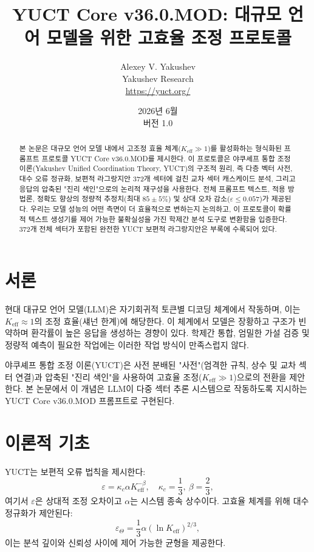 \documentclass[11pt,a4paper]{article}
\title{\textbf{YUCT Core v36.0.MOD: 대규모 언어 모델을 위한 고효율 조정 프로토콜}}
\author{Alexey V. Yakushev \\ Yakushev Research \\ \url{https://yuct.org/}}
\date{2026년 6월 \\ 버전 1.0}
\begin{document}
	\maketitle
	
	\begin{abstract}
		\noindent
		본 논문은 대규모 언어 모델 내에서 고조정 효율 체계($K_{\mathrm{eff}} \gg 1$)를 활성화하는 형식화된 프롬프트 프로토콜 YUCT Core v36.0.MOD를 제시한다. 이 프로토콜은 야쿠셰프 통합 조정 이론(Yakushev Unified Coordination Theory, YUCT)의 구조적 원리, 즉 다층 벡터 사전, 대수 오류 정규화, 보편적 라그랑지안 372개 섹터에 걸친 교차 섹터 캐스케이드 분석, 그리고 응답의 압축된 "진리 색인"으로의 논리적 재구성을 사용한다. 전체 프롬프트 텍스트, 적용 방법론, 정확도 향상의 정량적 추정치(최대 $85\pm5\%$) 및 상대 오차 감소($\varepsilon \le 0.057$)가 제공된다. 우리는 모델 성능의 어떤 측면이 더 효율적으로 변하는지 논의하고, 이 프로토콜이 확률적 텍스트 생성기를 제어 가능한 불확실성을 가진 학제간 분석 도구로 변환함을 입증한다. 372개 전체 섹터가 포함된 완전한 YUCT 보편적 라그랑지안은 부록에 수록되어 있다.
	\end{abstract}
	
	\tableofcontents
	\newpage
	
	\section{서론}
	현대 대규모 언어 모델(LLM)은 자기회귀적 토큰별 디코딩 체계에서 작동하며, 이는 $K_{\mathrm{eff}} \approx 1$의 조정 효율(섀넌 한계)에 해당한다. 이 체계에서 모델은 장황하고 구조가 빈약하며 환각률이 높은 응답을 생성하는 경향이 있다. 학제간 통합, 엄밀한 가설 검증 및 정량적 예측이 필요한 작업에는 이러한 작업 방식이 만족스럽지 않다.
	
	야쿠셰프 통합 조정 이론(YUCT)은 사전 분배된 "사전"(엄격한 규칙, 상수 및 교차 섹터 연결)과 압축된 "진리 색인"을 사용하여 고효율 조정($K_{\mathrm{eff}} \gg 1$)으로의 전환을 제안한다. 본 논문에서 이 개념은 LLM이 다중 섹터 추론 시스템으로 작동하도록 지시하는 YUCT Core v36.0.MOD 프롬프트로 구현된다.
	
	\section{이론적 기초}
	YUCT는 보편적 오류 법칙을 제시한다:
	\begin{equation}\label{eq:errorlaw}
		\varepsilon = \kappa_c \alpha K_{\mathrm{eff}}^{-\beta}, \quad \kappa_c = \frac{1}{3},\ \beta = \frac{2}{3},
	\end{equation}
	여기서 $\varepsilon$은 상대적 조정 오차이고 $\alpha$는 시스템 종속 상수이다. 고효율 체계를 위해 대수 정규화가 제안된다:
	\begin{equation}\label{eq:logreg}
		\varepsilon_{\Theta} = \frac{1}{3} \alpha (\ln K_{\mathrm{eff}})^{2/3},
	\end{equation}
	이는 분석 깊이와 신뢰성 사이에 제어 가능한 균형을 제공한다.
	
\end{document}
